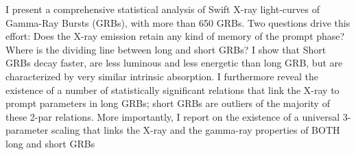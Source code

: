 


\bigskip



\bigskip

\noindent I present a comprehensive statistical analysis of Swift X-ray light-curves of Gamma-Ray Bursts (GRBs), with more than 650 GRBs. Two questions drive this effort: Does the X-ray emission retain any kind of memory of the prompt phase? Where is the dividing line between long and short GRBs? I show that Short GRBs decay faster, are less luminous and less energetic than long GRB, but are characterized by very similar intrinsic absorption. I furthermore reveal the existence of a number of statistically significant relations that link the X-ray to prompt parameters in long GRBs; short GRBs are outliers of the majority of these 2-par relations. More importantly, I report on the existence of a universal 3-parameter scaling that links the X-ray and the gamma-ray properties of BOTH long and short GRBs

